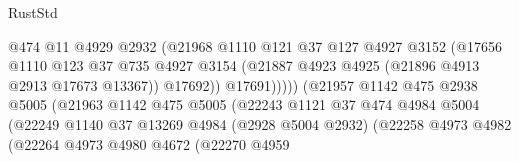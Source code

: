 \begin{lexlean}{RustStd}
\begin{coremodule}
{\begin{coremodule}
{{{{{{{{{{{{{{{{{{{{{{{{{{{{{{{{{{{{{{{{{{{{{{{{{{{{{{{{{{{{{{{{{{{{{{{{{{{{{{                                          @474
                                          @11
                                          @4929
                                          @2932
                                          (@21968
                                            @1110
                                            @121
                                            @37
                                            @127
                                            @4927
                                            @3152
                                            (@17656
                                              @1110
                                              @123
                                              @37
                                              @735
                                              @4927
                                              @3154
                                              (@21887
                                                @4923
                                                @4925
                                                (@21896 @4913 @2913 @17673 @13367))
                                              @17692))
                                          @17691)))))
                                (@21957
                                  @1142
                                  @475
                                  @2938
                                  @5005
                                  (@21963
                                    @1142
                                    @475
                                    @5005
                                    (@22243
                                      @1121
                                      @37
                                      @474
                                      @4984
                                      @5004
                                      (@22249
                                        @1140
                                        @37
                                        @13269
                                        @4984
                                        (@2928 @5004 @2932)
                                        (@22258
                                          @4973
                                          @4982
                                          (@22264
                                            @4973
                                            @4980
                                            @4672
                                            (@22270
                                              @4959
}}}}}}}}}}}}}}}}}}}}}}}}}}}}}}}}}}}}}}}}}}}}}}}}}}}}}}}}}}}}}}}}}}}}}}}}}}}}}}
\end{coremodule}}
\end{coremodule}
\end{lexlean}
